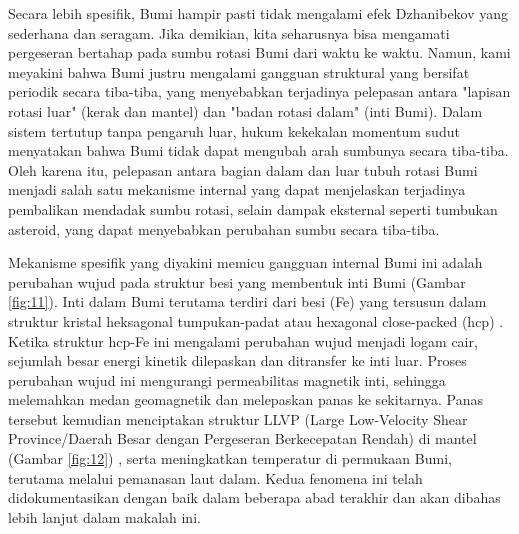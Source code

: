 \documentclass[10pt,twocolumn,letterpaper]{article}
\begin{document}
Secara lebih spesifik, Bumi hampir pasti tidak mengalami efek Dzhanibekov yang sederhana dan seragam. Jika demikian, kita seharusnya bisa mengamati pergeseran bertahap pada sumbu rotasi Bumi dari waktu ke waktu. Namun, kami meyakini bahwa Bumi justru mengalami gangguan struktural yang bersifat periodik secara tiba-tiba, yang menyebabkan terjadinya pelepasan antara "lapisan rotasi luar" (kerak dan mantel) dan "badan rotasi dalam" (inti Bumi). Dalam sistem tertutup tanpa pengaruh luar, hukum kekekalan momentum sudut menyatakan bahwa Bumi tidak dapat mengubah arah sumbunya secara tiba-tiba. Oleh karena itu, pelepasan antara bagian dalam dan luar tubuh rotasi Bumi menjadi salah satu mekanisme internal yang dapat menjelaskan terjadinya pembalikan mendadak sumbu rotasi, selain dampak eksternal seperti tumbukan asteroid, yang dapat menyebabkan perubahan sumbu secara tiba-tiba.

Mekanisme spesifik yang diyakini memicu gangguan internal Bumi ini adalah perubahan wujud pada struktur besi yang membentuk inti Bumi (Gambar \ref{fig:11}). Inti dalam Bumi terutama terdiri dari besi (Fe) yang tersusun dalam struktur kristal heksagonal tumpukan-padat atau hexagonal close-packed (hcp) \cite{141}. Ketika struktur hcp-Fe ini mengalami perubahan wujud menjadi logam cair, sejumlah besar energi kinetik dilepaskan dan ditransfer ke inti luar. Proses perubahan wujud ini mengurangi permeabilitas magnetik inti, sehingga melemahkan medan geomagnetik dan melepaskan panas ke sekitarnya. Panas tersebut kemudian menciptakan struktur LLVP (Large Low-Velocity Shear Province/Daerah Besar dengan Pergeseran Berkecepatan Rendah) di mantel (Gambar \ref{fig:12}) \cite{38}, serta meningkatkan temperatur di permukaan Bumi, terutama melalui pemanasan laut dalam. Kedua fenomena ini telah didokumentasikan dengan baik dalam beberapa abad terakhir dan akan dibahas lebih lanjut dalam makalah ini.
\end{document}
